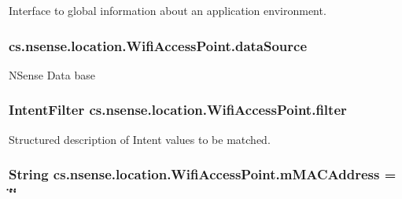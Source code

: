 Interface to global information about an application environment. \hypertarget{classcs_1_1nsense_1_1location_1_1_wifi_access_point_aea07181cba10c042b1b9b079b557b342}{
\subsubsection[{data\-Source}]{ cs.\-nsense.\-location.\-Wifi\-Access\-Point.\-data\-Source\hspace{0.3cm}{\ttfamily [private]}}}\label{classcs_1_1nsense_1_1location_1_1_wifi_access_point_aea07181cba10c042b1b9b079b557b342}
N\-Sense Data base \hypertarget{classcs_1_1nsense_1_1location_1_1_wifi_access_point_a8abf89fb56541865315ae6ca10e2246f}{
\subsubsection[{filter}]{\setlength{\rightskip}{0pt plus 5cm}Intent\-Filter cs.\-nsense.\-location.\-Wifi\-Access\-Point.\-filter\hspace{0.3cm}{\ttfamily [private]}}}\label{classcs_1_1nsense_1_1location_1_1_wifi_access_point_a8abf89fb56541865315ae6ca10e2246f}
Structured description of Intent values to be matched. \hypertarget{classcs_1_1nsense_1_1location_1_1_wifi_access_point_ac9e567df7f55043b5d1a60ecc7de4be9}{
\subsubsection[{m\-M\-A\-C\-Address}]{\setlength{\rightskip}{0pt plus 5cm}String cs.\-nsense.\-location.\-Wifi\-Access\-Point.\-m\-M\-A\-C\-Address = \char`\"{}\char`\"{}\hspace{0.3cm}{\ttfamily [private]}}}\label{classcs_1_1nsense_1_1location_1_1_wifi_access_point_ac9e567df7f55043b5d1a60ecc7de4be9}
